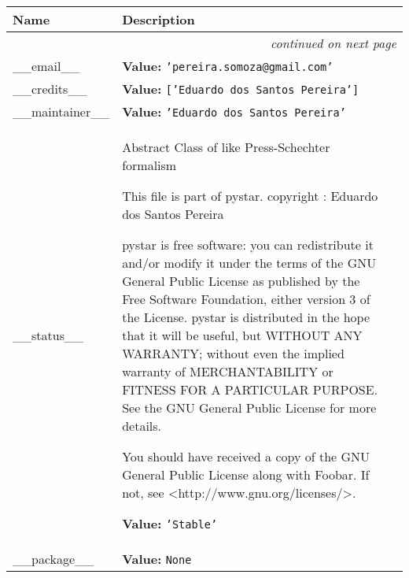    \vspace{-1cm}
\hspace{\varindent}\begin{longtable}{|p{\varnamewidth}|p{\vardescrwidth}|l}
\cline{1-2}
\cline{1-2} \centering \textbf{Name} & \centering \textbf{Description}& \\
\cline{1-2}
\endhead\cline{1-2}\multicolumn{3}{r}{\small\textit{continued on next page}}\\\endfoot\cline{1-2}
\endlastfoot\raggedright \_\-\_\-e\-m\-a\-i\-l\-\_\-\_\- & \raggedright \textbf{Value:} 
{\tt \texttt{'}\texttt{pereira.somoza@gmail.com}\texttt{'}}&\\
\cline{1-2}
\raggedright \_\-\_\-c\-r\-e\-d\-i\-t\-s\-\_\-\_\- & \raggedright \textbf{Value:} 
{\tt \texttt{[}\texttt{'}\texttt{Eduardo dos Santos Pereira}\texttt{'}\texttt{]}}&\\
\cline{1-2}
\raggedright \_\-\_\-m\-a\-i\-n\-t\-a\-i\-n\-e\-r\-\_\-\_\- & \raggedright \textbf{Value:} 
{\tt \texttt{'}\texttt{Eduardo dos Santos Pereira}\texttt{'}}&\\
\cline{1-2}
\raggedright \_\-\_\-s\-t\-a\-t\-u\-s\-\_\-\_\- & \raggedright Abstract Class of like Press-Schechter formalism

          This file is part of pystar. copyright : Eduardo dos Santos 
          Pereira

          pystar is free software: you can redistribute it and/or modify it
          under the terms of the GNU General Public License as published by
          the Free Software Foundation, either version 3 of the License. 
          pystar is distributed in the hope that it will be useful, but 
          WITHOUT ANY WARRANTY; without even the implied warranty of 
          MERCHANTABILITY or FITNESS FOR A PARTICULAR PURPOSE.  See the GNU
          General Public License for more details.

          You should have received a copy of the GNU General Public License
          along with Foobar.  If not, see 
          {\textless}http://www.gnu.org/licenses/{\textgreater}.

\textbf{Value:} 
{\tt \texttt{'}\texttt{Stable}\texttt{'}}&\\
\cline{1-2}
\raggedright \_\-\_\-p\-a\-c\-k\-a\-g\-e\-\_\-\_\- & \raggedright \textbf{Value:} 
{\tt None}&\\
\cline{1-2}
\end{longtable}



